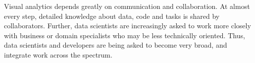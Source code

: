 Visual analytics depends greatly on communication and collaboration.
At almost every step, detailed knowledge about data, code and tasks
is shared by collaborators. 
Further, data scientists are increasingly asked to work more closely
with business or domain specialists who may be less technically oriented.
Thus, data scientists and developers are being asked to become
very broad, and integrate work across the spectrum.



